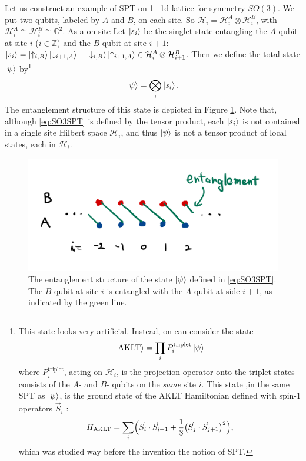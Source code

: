 \documentclass[
]{scrartcl}
\numberwithin{equation}{section}
\theoremstyle{definition}
\theoremstyle{definition}
\theoremstyle{definition}
\theoremstyle{definition}
\theoremstyle{remark}
\begin{document}
Let us construct an example of SPT on 1+1d lattice for symmetry \(SO(3)\).
We put two qubits, labeled by \(A\) and \(B\), on each site. So \(\mathcal{H}_i = \mathcal{H}^A_i \otimes \mathcal{H}^B_i\), with \(\mathcal{H}^A_i \cong \mathcal{H}^B_i \cong \mathbb{C}^2\).
As a on-site
Let \(\ket{s_i}\) be the singlet state entangling the \(A\)-qubit at site \(i\) (\(i\in\mathbb{Z}\)) and the \(B\)-qubit at site \(i+1\): \(\ket{s_i} = \ket{\uparrow_{i,B}}\ket{\downarrow_{i+1,A}} - \ket{\downarrow_{i,B}} \ket{\uparrow_{i+1,A}} \in \mathcal{H}_{i}^A\otimes \mathcal{H}_{i+1}^B\).
Then we define the total state \(\ket{\psi}\) by\footnote{This state looks very artificial. Instead, on can consider the state
  \begin{equation*}
    \ket{\mathrm{AKLT}} = \prod_i P_i^\text{triplet} \ket{\psi}
  \end{equation*}
  where \(P_i^\text{triplet}\), acting on \(\mathcal{H}_i\), is the projection operator onto the triplet states consists of the \(A\)- and \(B\)- qubits on the \emph{same} site \(i\).
  This state ,in the same SPT as \(\ket{\psi}\), is the ground state of the AKLT Hamiltonian defined with spin-1 operators \(\vec{S}_i\) \textcite{AKLT}:
  \begin{equation*}
    H_{\mathrm{AKLT}} = \sum_i \Bigl(\vec{S}_i \cdot \vec{S}_{i+1} + \frac13 \bigl(\vec{S}_{j} \cdot \vec{S}_{j+1}\bigr)^2\Bigr),
  \end{equation*}
  which was studied way before the invention the notion of SPT.}
\begin{equation}
  \label{eq:SO3SPT}
  \ket{\psi} = \bigotimes_i \ket{s_i}.
\end{equation}
The entanglement structure of this state is depicted in Figure \ref{fig:so3spt}.
Note that, although \eqref{eq:SO3SPT} is defined by the tensor product, each \(\ket{s_i}\) is not contained in a single site Hilbert space \(\mathcal{H}_i\), and thus \(\ket{\psi}\) is not a tensor product of local states, each in \(\mathcal{H}_i\).

\begin{figure}

{\centering \includegraphics[width=0.5\linewidth]{figs/so3spt} 

}

\caption{The entanglement structure of the state \(\ket{\psi}\) defined in \eqref{eq:SO3SPT}. The \(B\)-qubit at site \(i\) is entangled with the \(A\)-qubit at side \(i+1\), as indicated by the green line.}\label{fig:so3spt}
\end{figure}
\end{document}
